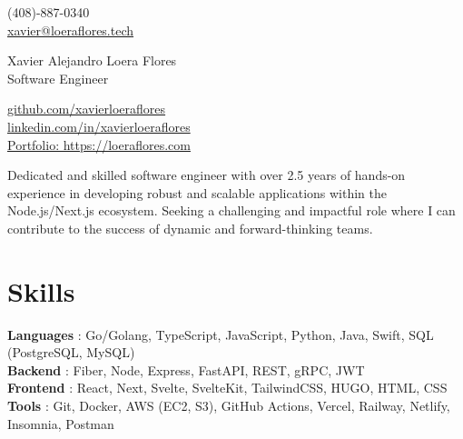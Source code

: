\documentclass[a4,10pt]{article}
\newcommand{\hskills}[1]{
\textbf{\bfseries #1} }
\begin{document}
\begin{center}
    \begin{minipage}[b]{0.29\textwidth}
            (408)-887-0340 \\
            \href{mailto:xavier@loeraflores.tech}{xavier@loeraflores.tech} 
    \end{minipage}%
    \begin{minipage}[b]{0.4\textwidth}
            \centering
            {\Large Xavier Alejandro Loera Flores} \\ %
            \vspace{0.1cm}
            {\color{UI_blue} \Large{Software Engineer}} \\
    \end{minipage}%
    \begin{minipage}[b]{0.29\textwidth}
            \flushright  %
            {\href{https://github.com/xavierloeraflores}{github.com/xavierloeraflores} } \\
            {\href{https://www.linkedin.com/in/xavierloeraflores}{linkedin.com/in/xavierloeraflores} } \\
            \href{https://loeraflores.com}{Portfolio: https://loeraflores.com}
    \end{minipage}   
    
\vspace{-0.15cm} 
{\color{UI_blue} \hrulefill}
\end{center}
\vspace{-0.25cm}

{Dedicated and skilled software engineer with over 2.5 years of hands-on experience in developing robust and scalable applications within the Node.js/Next.js ecosystem. Seeking a challenging and impactful role where I can contribute to the success of dynamic and forward-thinking teams.}
\vspace{-0.4cm}

\section{Skills}
\hskills{Languages}: {Go/Golang, TypeScript, JavaScript, Python,  Java, Swift, SQL (PostgreSQL, MySQL)}  \\
\hskills{Backend}: {Fiber, Node, Express, FastAPI, REST, gRPC, JWT }  \\
\hskills{Frontend}: {React, Next, Svelte, SvelteKit, TailwindCSS, HUGO, HTML, CSS} \\
\hskills{Tools}: {Git, Docker, AWS (EC2, S3), GitHub Actions, Vercel, Railway, Netlify, Insomnia, Postman} \\
\vspace{-0.2cm}
\end{document}

